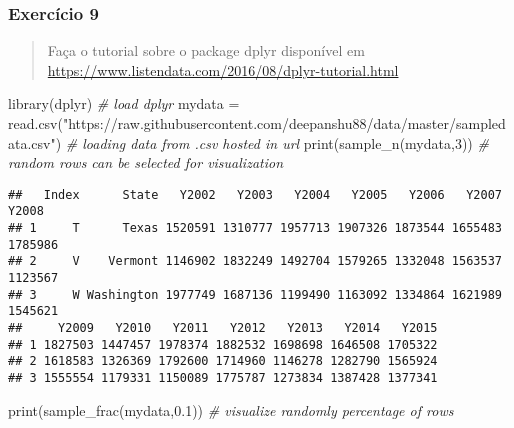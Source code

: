 \documentclass[
]{article}
\newenvironment{Shaded}{\begin{snugshade}}{\end{snugshade}}
\newcommand{\CommentTok}[1]{\textcolor[rgb]{0.56,0.35,0.01}{\textit{#1}}}
\newcommand{\DecValTok}[1]{\textcolor[rgb]{0.00,0.00,0.81}{#1}}
\newcommand{\FloatTok}[1]{\textcolor[rgb]{0.00,0.00,0.81}{#1}}
\newcommand{\FunctionTok}[1]{\textcolor[rgb]{0.00,0.00,0.00}{#1}}
\newcommand{\NormalTok}[1]{#1}
\newcommand{\OtherTok}[1]{\textcolor[rgb]{0.56,0.35,0.01}{#1}}
\newcommand{\StringTok}[1]{\textcolor[rgb]{0.31,0.60,0.02}{#1}}
\begin{document}
\hypertarget{exercuxedcio-9}{%
\subsubsection{Exercício 9}\label{exercuxedcio-9}}

\begin{quote}
Faça o tutorial sobre o package dplyr disponível em
\url{https://www.listendata.com/2016/08/dplyr-tutorial.html}
\end{quote}

\begin{Shaded}
\begin{Highlighting}[]
\FunctionTok{library}\NormalTok{(dplyr) }\CommentTok{\# load dplyr}
\NormalTok{mydata }\OtherTok{=} \FunctionTok{read.csv}\NormalTok{(}\StringTok{"https://raw.githubusercontent.com/deepanshu88/data/master/sampledata.csv"}\NormalTok{) }\CommentTok{\# loading data from .csv hosted in url}
\FunctionTok{print}\NormalTok{(}\FunctionTok{sample\_n}\NormalTok{(mydata,}\DecValTok{3}\NormalTok{)) }\CommentTok{\# random rows can be selected for visualization}
\end{Highlighting}
\end{Shaded}

\begin{verbatim}
##   Index      State   Y2002   Y2003   Y2004   Y2005   Y2006   Y2007   Y2008
## 1     T      Texas 1520591 1310777 1957713 1907326 1873544 1655483 1785986
## 2     V    Vermont 1146902 1832249 1492704 1579265 1332048 1563537 1123567
## 3     W Washington 1977749 1687136 1199490 1163092 1334864 1621989 1545621
##     Y2009   Y2010   Y2011   Y2012   Y2013   Y2014   Y2015
## 1 1827503 1447457 1978374 1882532 1698698 1646508 1705322
## 2 1618583 1326369 1792600 1714960 1146278 1282790 1565924
## 3 1555554 1179331 1150089 1775787 1273834 1387428 1377341
\end{verbatim}

\begin{Shaded}
\begin{Highlighting}[]
\FunctionTok{print}\NormalTok{(}\FunctionTok{sample\_frac}\NormalTok{(mydata,}\FloatTok{0.1}\NormalTok{)) }\CommentTok{\# visualize  randomly percentage of rows}
\end{Highlighting}
\end{Shaded}
\end{document}
